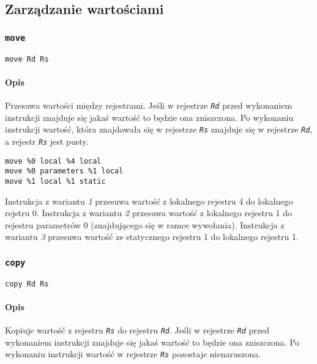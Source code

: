 \subsection{Zarządzanie wartościami}
\label{viua_vm_ops_value_management}

\subsubsection{\texttt{move}}

\begin{lstlisting}
move Rd Rs
\end{lstlisting}

\paragraph*{Opis} Przesuwa wartości między rejestrami. Jeśli w rejestrze
\texttt{\emph{Rd}} przed wykonaniem instrukcji znajduje się jakaś wartość to
będzie ona zniszczona. Po wykonaniu instrukcji wartość, która znajdowała się w
rejestrze \texttt{\emph{Rs}} znajduje się w rejestrze \texttt{\emph{Rd}}, a
rejestr \texttt{\emph{Rs}} jest pusty.

\begin{lstlisting}
move %0 local %4 local
move %0 parameters %1 local
move %1 local %1 static
\end{lstlisting}

Instrukcja z wariantu \emph{1} przesuwa wartość z lokalnego rejestru 4 do
lokalnego rejstru 0.
Instrukcja z wariantu \emph{2} przesuwa wartość z lokalnego rejestru 1 do
rejestru parametrów 0 (znajdującego się w ramce wywołania).
Instrukcja z wariantu \emph{3} przesuwa wartość ze statycznego rejestru 1 do
lokalnego rejestru 1.

\subsubsection{\texttt{copy}}

\begin{lstlisting}
copy Rd Rs
\end{lstlisting}

\paragraph*{Opis} Kopiuje wartość z rejestru \texttt{\emph{Rs}} do rejestru
\texttt{\emph{Rd}}. Jeśli w rejestrze \texttt{\emph{Rd}} przed wykonaniem
instrukcji znajduje się jakaś wartość to będzie ona zniszczona. Po wykonaniu
instrukcji wartość w rejestrze \texttt{\emph{Rs}} pozostaje nienaruszona.

